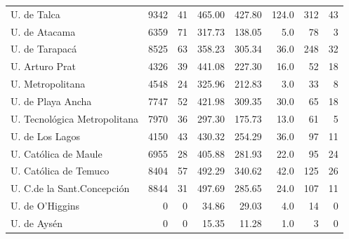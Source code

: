 \documentclass[twocolumn]{article}
\begin{document}
\begin{table}
\begin{tabular}{l rrrrrrr}
U. de Talca	               &  9342 	& 41 &    465.00& 427.80&124.0  &   312&	 43  \\
U. de Atacama              &  6359 	& 71 &    317.73& 138.05&  5.0  &    78&	  3  \\
U. de Tarapacá             &  8525 	& 63 &    358.23& 305.34& 36.0  &   248&	 32  \\
U. Arturo Prat             &  4326 	& 39 &    441.08& 227.30& 16.0  &    52&	 18  \\
U. Metropolitana           &  4548 	& 24 &    325.96& 212.83&  3.0  &    33&	  8  \\
U. de Playa Ancha          &  7747 	& 52 &    421.98& 309.35& 30.0  &    65&	 18  \\
U. Tecnológica Metropolitana& 7970 	& 36 &    297.30& 175.73& 13.0  &    61&	  5  \\
U. de Los Lagos            &  4150 	& 43 &    430.32& 254.29& 36.0  &    97&	 11  \\
U. Católica de Maule       &  6955 	& 28 &    405.88& 281.93& 22.0  &    95&	 24  \\
U. Católica de Temuco      &  8404 	& 57 &    492.29& 340.62& 42.0  &   125&	 26  \\
U. C.de la Sant.Concepción &  8844 	& 31 &    497.69& 285.65& 24.0  &   107&	 11  \\
U. de O'Higgins	           &     0 	&  0 &	   34.86& 29.03 &  4.0  &    14&	  0  \\
U. de Aysén                &	 0  &  0 & 	   15.35& 11.28 &  1.0  &    3 &      0  \\
\hline
\end{tabular}
\end{table}
\end{document}
